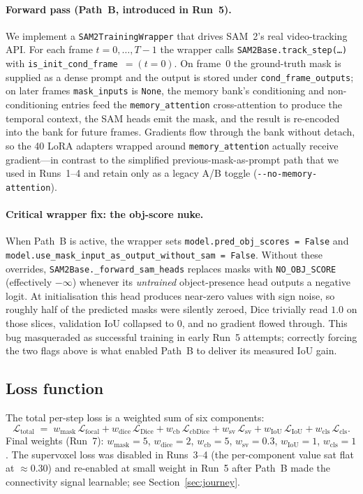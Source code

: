 \documentclass[11pt,a4paper]{article}
\begin{document}
\paragraph{Forward pass (Path~B, introduced in Run~5).} We implement a
\texttt{SAM2TrainingWrapper} that drives SAM~2's real video-tracking
API. For each frame $t = 0, \dots, T-1$ the wrapper calls
\texttt{SAM2Base.track\_step(\dots)} with
\texttt{is\_init\_cond\_frame}~$=(t{=}0)$. On frame~$0$ the ground-truth
mask is supplied as a dense prompt and the output is stored under
\texttt{cond\_frame\_outputs}; on later frames \texttt{mask\_inputs} is
\texttt{None}, the memory bank's conditioning and non-conditioning
entries feed the \texttt{memory\_attention} cross-attention to produce
the temporal context, the SAM heads emit the mask, and the result is
re-encoded into the bank for future frames. Gradients flow through the
bank without detach, so the 40 LoRA adapters wrapped around
\texttt{memory\_attention} actually receive gradient---in contrast to
the simplified previous-mask-as-prompt path that we used in Runs~1--4
and retain only as a legacy A/B toggle (\texttt{-{}-no-memory-attention}).

\paragraph{Critical wrapper fix: the obj-score nuke.} When Path~B is
active, the wrapper sets \texttt{model.pred\_obj\_scores~=~False} and
\texttt{model.use\_mask\_input\_as\_output\_without\_sam~=~False}.
Without these overrides, \texttt{SAM2Base.\_forward\_sam\_heads}
replaces masks with \texttt{NO\_OBJ\_SCORE} (effectively $-\infty$)
whenever its \emph{untrained} object-presence head outputs a negative
logit. At initialisation this head produces near-zero values with sign
noise, so roughly half of the predicted masks were silently zeroed,
Dice trivially read $1.0$ on those slices, validation IoU collapsed to
$0$, and no gradient flowed through. This bug masqueraded as successful
training in early Run~5 attempts; correctly forcing the two flags above
is what enabled Path~B to deliver its measured IoU gain.

\subsection{Loss function}

The total per-step loss is a weighted sum of six components:
\begin{equation}
    \mathcal{L}_\text{total} \;=\;
        w_\text{mask}\,\mathcal{L}_\text{focal}
      + w_\text{dice}\,\mathcal{L}_\text{Dice}
      + w_\text{cb}\,\mathcal{L}_\text{cbDice}
      + w_\text{sv}\,\mathcal{L}_\text{sv}
      + w_\text{IoU}\,\mathcal{L}_\text{IoU}
      + w_\text{cls}\,\mathcal{L}_\text{cls}.
\label{eq:total-loss}
\end{equation}
Final weights (Run~7):
$w_\text{mask}{=}5$, $w_\text{dice}{=}2$, $w_\text{cb}{=}5$,
$w_\text{sv}{=}0.3$, $w_\text{IoU}{=}1$, $w_\text{cls}{=}1$. The
supervoxel loss was disabled in Runs~3--4 (the per-component value sat
flat at $\approx 0.30$) and re-enabled at small weight in Run~5 after
Path~B made the connectivity signal learnable; see
Section~\ref{sec:journey}.
\end{document}
